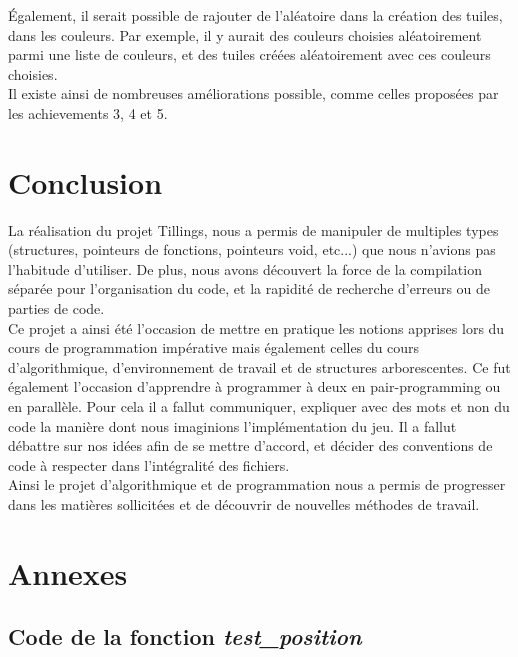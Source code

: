 \documentclass[11pt]{article}
\begin{document}
\'Egalement, il serait possible de rajouter de l'aléatoire dans la création des tuiles, dans les couleurs. Par exemple, il y aurait des couleurs choisies aléatoirement parmi une liste de couleurs, et des tuiles créées aléatoirement avec ces couleurs choisies. \\

Il existe ainsi de nombreuses améliorations possible, comme celles proposées par les achievements 3, 4 et 5.

\section{Conclusion} 
La réalisation du projet Tillings, nous a permis de manipuler de multiples types (structures, pointeurs de fonctions, pointeurs void, etc...) que nous n'avions pas l'habitude d'utiliser. De plus, nous avons découvert la force de la compilation séparée pour l'organisation du code, et la rapidité de recherche d'erreurs ou de parties de code. \\

Ce projet a ainsi été l'occasion de mettre en pratique les notions apprises lors du cours de programmation impérative mais également celles du cours d'algorithmique, d'environnement de travail et de structures arborescentes. Ce fut également l'occasion d'apprendre à programmer à deux en pair-programming ou en parallèle. Pour cela il a fallut communiquer, expliquer avec des mots et non du code la manière dont nous imaginions l'implémentation du jeu. Il a fallut débattre sur nos idées afin de se mettre d'accord, et décider des conventions de code à respecter dans l'intégralité des fichiers. \\

Ainsi le projet d'algorithmique et de programmation nous a permis de progresser dans les matières sollicitées et de découvrir de nouvelles méthodes de travail.

\newpage 
\section{Annexes}
\subsection{Code de la fonction \emph{test\_position}}
\end{document}
